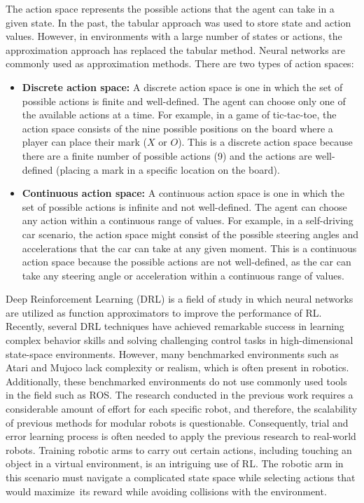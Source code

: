 \documentclass[12pt,oneside]{article}
\begin{document}
 The action space represents the possible actions that the agent can take in a given state. In the past, the tabular approach was used to store state and action values. However, in environments with a large number of states or actions, the approximation approach has replaced the tabular method. Neural networks are commonly used as approximation methods. There are two types of action spaces:
 \begin{itemize}
\item \textbf{ Discrete action space:} A discrete action space is one in which the set of possible actions is finite and well-defined. The agent can choose only one of the available actions at a time. For example, in a game of tic-tac-toe, the action space consists of the nine possible positions on the board where a player can place their mark ($X$ or $O$). This is a discrete action space because there are a finite number of possible actions (9) and the actions are well-defined (placing a mark in a specific location on the board).
\item \textbf{ Continuous action space:} A continuous action space is one in which the set of possible actions is infinite and not well-defined. The agent can choose any action within a continuous range of values. For example, in a self-driving car scenario, the action space might consist of the possible steering angles and accelerations that the car can take at any given moment. This is a continuous action space because the possible actions are not well-defined, as the car can take any steering angle or acceleration within a continuous range of values.
 \end{itemize}

Deep Reinforcement Learning (DRL) is a field of study in which neural networks are utilized as function approximators to improve the performance of RL. Recently, several DRL techniques have achieved remarkable success in learning complex behavior skills and solving challenging control tasks in high-dimensional state-space \cite{28_wu2017scalable} environments. However, many benchmarked environments such as Atari \cite{29_mnih2013playing} and Mujoco \cite{30_todorov2012mujoco} lack complexity or realism, which is often present in robotics. Additionally, these benchmarked environments \cite{31_nogueira2017autonomously} do not use commonly used tools in the field such as ROS.
The research conducted in the previous work requires a considerable amount of effort for each specific robot, and therefore, the scalability of previous methods for modular robots is questionable. Consequently, trial and error learning process is often needed to apply the previous research to real-world robots. Training robotic arms to carry out certain actions, including touching an object in a virtual environment, is an intriguing use of RL. The robotic arm in this scenario must navigate a complicated state space while selecting actions that would maximize its reward while avoiding collisions with the environment. 
\end{document}
